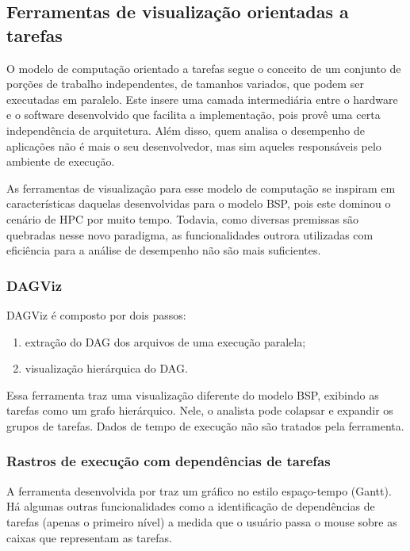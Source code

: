 \subsection{Ferramentas de visualização orientadas a tarefas}

O modelo de computação orientado a tarefas segue o conceito de um conjunto de 
porções de trabalho independentes, de tamanhos variados, que podem ser 
executadas em paralelo. Este insere uma camada intermediária entre o 
hardware e o software desenvolvido que facilita a implementação, pois provê uma 
certa independência de arquitetura. Além disso, quem analisa o desempenho de 
aplicações não é mais o seu desenvolvedor, mas sim aqueles responsáveis pelo 
ambiente de execução.

As ferramentas de visualização para esse modelo de computação se inspiram em 
características daquelas desenvolvidas para o modelo BSP, pois este dominou o 
cenário de HPC por muito tempo. Todavia, como diversas premissas são quebradas 
nesse novo paradigma, as funcionalidades outrora utilizadas com eficiência 
para a análise de desempenho não são mais suficientes.

\subsubsection*{DAGViz}

DAGViz \cite{ref:dagviz} é composto por dois passos: 

\begin{enumerate}
    \item extração do DAG dos arquivos de uma execução paralela;
    \item visualização hierárquica do DAG.
\end{enumerate}

Essa ferramenta traz uma visualização diferente do modelo BSP, exibindo as 
tarefas como um grafo hierárquico. Nele, o analista pode colapsar e expandir os 
grupos de tarefas. Dados de tempo de execução não são tratados pela ferramenta.

\subsubsection*{Rastros de execução com dependências de tarefas}

A ferramenta desenvolvida por \citet{ref:visuexecdep} traz um gráfico no estilo 
espaço-tempo (Gantt). Há algumas outras funcionalidades como a identificação de 
dependências de tarefas (apenas o primeiro nível) a medida que o usuário passa o 
mouse sobre as caixas que representam as tarefas.

